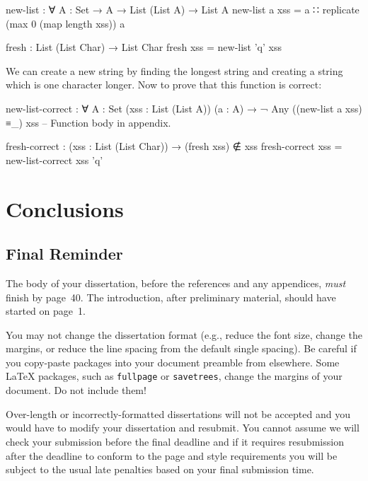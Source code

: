 \documentclass[logo,bsc,singlespacing,parskip,online]{infthesis}
\renewenvironment{code}{\mintedcopy[breaklines]{agda}}{\endmintedcopy}
\begin{document}
\begin{code}
new-list : ∀ {A : Set} → A → List (List A) → List A
new-list a xss = a ∷ replicate (max 0 (map length xss)) a

fresh : List (List Char) → List Char
fresh xss = new-list 'q' xss
\end{code}

We can create a new string by finding the longest string and creating a string which is one
character longer. Now to prove that this function is correct:

\begin{code}

new-list-correct : ∀ {A : Set} (xss : List (List A)) (a : A)
  → ¬ Any ((new-list a xss) ≡_) xss
-- Function body in appendix.

fresh-correct : (xss : List (List Char)) → (fresh xss) ∉ xss
fresh-correct xss = new-list-correct xss 'q'
\end{code}

\chapter{Conclusions}

\section{Final Reminder}

The body of your dissertation, before the references and any appendices,
\emph{must} finish by page~40. The introduction, after preliminary material,
should have started on page~1.

You may not change the dissertation format (e.g., reduce the font size, change
the margins, or reduce the line spacing from the default single spacing). Be
careful if you copy-paste packages into your document preamble from elsewhere.
Some \LaTeX{} packages, such as \texttt{fullpage} or \texttt{savetrees}, change
the margins of your document. Do not include them!

Over-length or incorrectly-formatted dissertations will not be accepted and you
would have to modify your dissertation and resubmit. You cannot assume we will
check your submission before the final deadline and if it requires resubmission
after the deadline to conform to the page and style requirements you will be
subject to the usual late penalties based on your final submission time.

% 

% 

\end{document}
